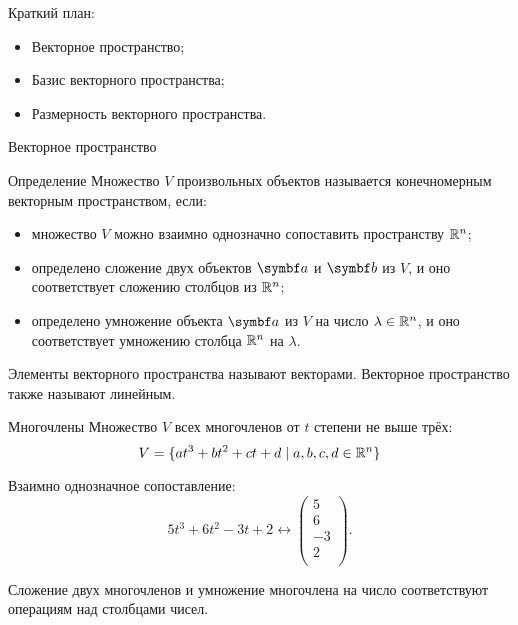 
\begin{frame} %


\end{frame}



\begin{frame}{Краткий план:}
  \begin{itemize}[<+->]
    \item Векторное пространство;
    \item Базис векторного пространства;
    \item Размерность векторного пространства.
  \end{itemize}

\end{frame}


\begin{frame}{Векторное пространство}

\begin{block}{Определение} 
Множество $V$ произвольных объектов называется \alert{конечномерным векторным пространством}, если:

\begin{itemize}[<+->]
\item множество $V$ можно взаимно однозначно сопоставить пространству $\mathbb{R}^n$;
\item определено сложение двух объектов $\ba$ и $\bb$ из $V$, 
и оно соответствует сложению столбцов из $\mathbb{R}^n$;
\item определено умножение объекта $\ba$ из $V$ на число $\lambda\in \mathbb{R}^n$, 
и оно соответствует умножению столбца $\mathbb{R}^n$ на $\lambda$.
\end{itemize}
\end{block}

\pause
Элементы векторного пространства называют векторами. 
\pause
Векторное пространство также называют \alert{линейным}.

\end{frame}



\begin{frame}{Многочлены}
Множество $V$ всех многочленов от $t$ степени не выше трёх:
\[
V  = \{ at^3 + bt^2 + ct + d \mid a, b, c, d \in \mathbb{R}^n \}
\]

\pause
Взаимно однозначное сопоставление: 
\[5t^3 + 6t^2 - 3t + 2 \leftrightarrow \begin{pmatrix} 
    5 \\
    6 \\
    -3 \\
    2 \\
\end{pmatrix}.
\]
\pause


Сложение двух многочленов и умножение многочлена на число соответствуют операциям над столбцами чисел.
\end{frame}




